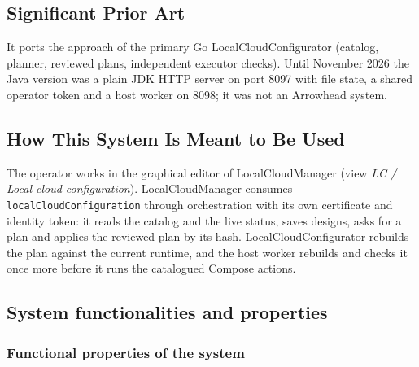 \documentclass[a4paper]{arrowhead}
\begin{document}
\newpage

\subsection{Significant Prior Art}
\label{sec:prior_art}

It ports the approach of the primary Go LocalCloudConfigurator (catalog, planner, reviewed plans, independent executor checks). Until November 2026 the Java version was a plain JDK HTTP server on port 8097 with file state, a shared operator token and a host worker on 8098; it was not an Arrowhead system.

\subsection{How This System Is Meant to Be Used}
\label{sec:use}

The operator works in the graphical editor of LocalCloudManager (view \emph{LC / Local cloud configuration}). LocalCloudManager consumes \texttt{local\allowbreak{}Cloud\allowbreak{}Configuration} through orchestration with its own certificate and identity token: it reads the catalog and the live status, saves designs, asks for a plan and applies the reviewed plan by its hash. LocalCloudConfigurator rebuilds the plan against the current runtime, and the host worker rebuilds and checks it once more before it runs the catalogued Compose actions.

\subsection{System functionalities and properties}
\label{sec:properties}

\subsubsection{Functional properties of the system}
\end{document}
